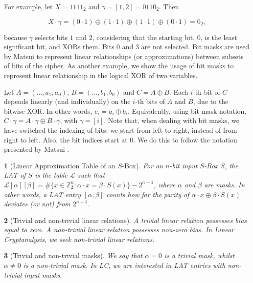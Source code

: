 \documentclass{report}
\newtheorem*{concept}{}{\bfseries}{\itshape}
\begin{document}
For example, let $X = 1111_2$ and $\gamma = [1, 2] = 0110_2$. Then

$$X \cdot \gamma = (0\cdot1) \oplus (1\cdot1) \oplus (1\cdot1) \oplus (0\cdot1) = 0_2,$$

because $\gamma$ selects bits $1$ and $2$, considering that the starting bit, $0$, is the least significant bit, and XORs them. Bits 0 and 3 are not selected. Bit masks are used by Matsui \cite{Matsui1993LinearCM} to represent linear relationships (or approximations) between subsets of bits of the cipher. As another example, we show the usage of bit masks to represent linear relationship in the logical XOR of two variables.

Let $A = (..., a_1, a_0)$, $B = (..., b_1, b_0)$ and $C = A \oplus B$. Each $i$-th bit of $C$ depends linearly (and individually) on the $i$-th bits of $A$ and $B$, due to the bitwise XOR. In other words, $c_i = a_i \oplus b_i$. Equivalently, using bit mask notation, $C \cdot \gamma = A \cdot \gamma \oplus B \cdot \gamma$, with $\gamma = [i]$. Note that, when dealing with bit masks, we have switched the indexing of bits: we start from left to right, instead of from right to left. Also, the bit indices start at 0. We do this to follow the notation presented by Matsui \cite{Matsui1993LinearCM}.

\begin{concept}[Linear Approximation Table of an $S$-Box]
For an $n$-bit input $S$-Box $S$, the LAT of $S$ is the table $\mathcal{L}$ such that  $\mathcal{L}[\alpha][\beta] = \# \{ x \in \mathbb{Z}_2^n : \alpha \cdot x = \beta \cdot S(x)\} - 2^{n-1}$, where $\alpha$ and $\beta$ are masks. In other words, a LAT entry $[\alpha, \beta]$ counts how far the parity of $\alpha \cdot x \oplus \beta \cdot S(x)$ deviates (or not) from $2^{n-1}$.
\end{concept}

\begin{concept}[Trivial and non-trivial linear relations]
A trivial linear relation possesses bias equal to zero. A non-trivial linear relation possesses non-zero bias. In Linear Cryptanalysis, we seek non-trivial linear relations.
\end{concept}

\begin{concept}[Trivial and non-trivial masks]
We say that $\alpha = 0$ is a trivial mask, whilst $\alpha \neq 0$ is a non-trivial mask. In LC, we are interested in LAT entries with non-trivial input masks.
\end{concept}
\end{document}
